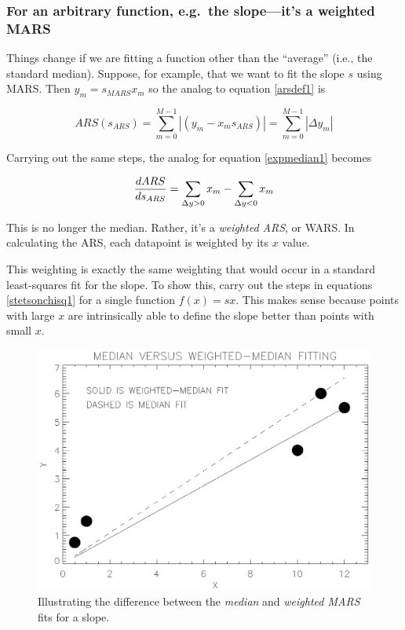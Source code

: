 \documentclass[psfig,preprint]{aastex}
\begin{document}
\subsubsection{ For an arbitrary function, e.g.\ the slope---it's a
  weighted MARS}

	Things change if we are fitting a function other than the
``average'' (i.e., the standard median). Suppose, for example, that we
want to fit the slope $s$ using MARS. Then $y_m = s_{MARS} x_m$ so the
analog to equation \ref{arsdef1} is

\begin{equation} \label{arsdef2}
ARS(s_{ARS}) = \sum_{m=0}^{M-1}  | (y_m - x_m s_{ARS})|
		 = \sum_{m=0}^{M-1}  | \Delta y_m |
\end{equation}

\noindent Carrying out the same steps, the analog for equation
\ref{expmedian1} becomes

\begin{equation} \label{expmedian2}
{ d ARS \over ds_{ARS}}= \sum_{\Delta y > 0} x_m 
 - \sum_{\Delta y < 0} x_m 
\end{equation}  

\noindent This is no longer the median. Rather, it's a {\it weighted
ARS}, or WARS. In calculating the ARS, each datapoint is weighted by its
$x$ value. 

	This weighting is exactly the same weighting that would occur in
a standard least-squares fit for the slope. To show this, carry out the
steps in equations \ref{stetsonchisq1} for a single function $f(x) =
sx$. This makes sense because points with large $x$ are intrinsically
able to define the slope better than points with small $x$.

\begin{figure}[h!] 
\begin{center} 
\includegraphics{slope_medianplot.ps} 
\end{center} 
\caption{Illustrating the difference between the {\it median} and {\it
weighted MARS} fits for a slope. \label{slope_medianplot}}
\end{figure}
\end{document}
